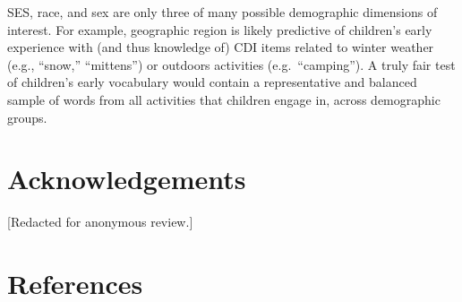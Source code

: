 \documentclass[10pt, letterpaper]{article}
\begin{document}
SES, race, and sex are only three of many possible demographic
dimensions of interest. For example, geographic region is likely
predictive of children's early experience with (and thus knowledge of)
CDI items related to winter weather (e.g., ``snow,'' ``mittens'') or
outdoors activities (e.g.~``camping''). A truly fair test of children's
early vocabulary would contain a representative and balanced sample of
words from all activities that children engage in, across demographic
groups.

\hypertarget{acknowledgements}{%
\section{Acknowledgements}\label{acknowledgements}}

{[}Redacted for anonymous review.{]}

\hypertarget{references}{%
\section{References}\label{references}}

\setlength{\parindent}{-0.1in} 
\setlength{\leftskip}{0.125in}

\noindent
\end{document}
